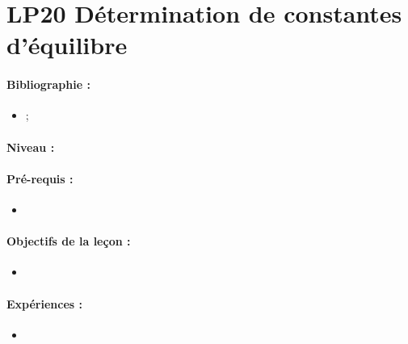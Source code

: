 \section{LP20 Détermination de constantes d'équilibre}

\paragraph{Bibliographie :}
\begin{itemize}
\item ;
\end{itemize}

\paragraph{Niveau :}

\paragraph{Pré-requis :}
\begin{itemize}
\item 
\end{itemize}

\paragraph{Objectifs de la leçon :}
\begin{itemize}
\item
\end{itemize}

\paragraph{Expériences :}
\begin{itemize}
\item
\end{itemize}